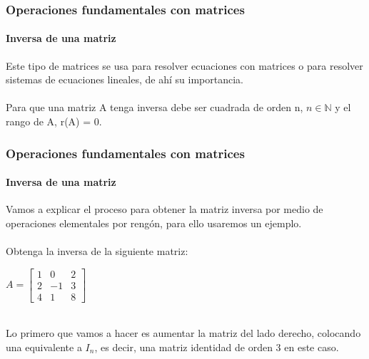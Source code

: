\documentclass[11pt]{beamer}
\begin{document}
\begin{frame}
\frametitle{Operaciones fundamentales con matrices}
\framesubtitle{Inversa de una matriz}
Este tipo de matrices se usa para resolver ecuaciones con matrices o para resolver sistemas de ecuaciones lineales, de ahí su importancia.\\ \hspace{0cm} \\
Para que una matriz A tenga inversa debe ser cuadrada de orden n, $n\in \mathbb{N}$ y el rango de A, r(A) = 0.
\end{frame}

\begin{frame}
\frametitle{Operaciones fundamentales con matrices}
\framesubtitle{Inversa de una matriz}
Vamos a explicar el proceso para obtener la matriz inversa por medio de operaciones elementales por rengón, para ello usaremos un ejemplo.\\ \hspace{0cm} \\
Obtenga la inversa de la siguiente matriz:\\
\begin{center}
${\displaystyle A = {\begin{bmatrix}1&0&2\\2&-1&3\\4&1&8\end{bmatrix}}}$\\ \hspace{0cm} \\
\end{center}
Lo primero que vamos a hacer es aumentar la matriz del lado derecho, colocando una equivalente a $I_n$, es decir, una matriz identidad de orden 3 en este caso.
\end{frame}
\end{document}
